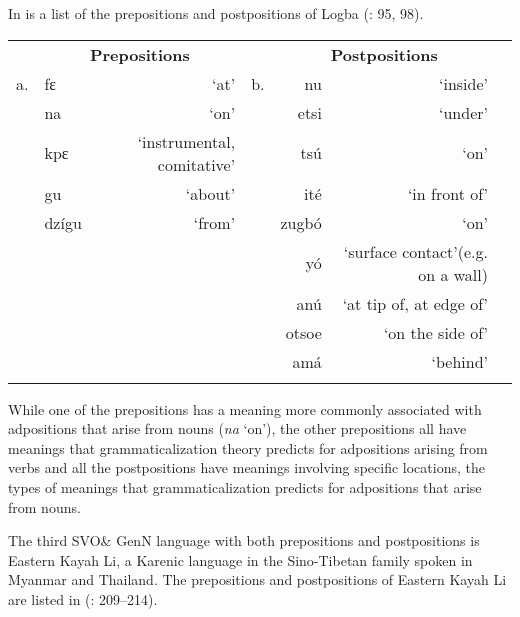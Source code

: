 \documentclass[output=paper]{langsci/langscibook}
\begin{document}
In  is a list of the prepositions and postpositions of Logba (\citealt{Dorvlo2008}: 95, 98).


\begin{table}
\begin{tabularx}{\textwidth}{Xlrrrrr}
\lsptoprule
 & \multicolumn{2}{c}{\bfseries Prepositions} &  & \multicolumn{2}{c}{\bfseries Postpositions}\\
a. & fɛ & ‘at’ & b. & nu & ‘inside’\\
 & na & ‘on’ &  & etsi & ‘under’\\
 & kpɛ & ‘instrumental, comitative’ &  & tsú & ‘on’\\
 & gu & ‘about’ &  & ité & ‘in front of’\\
 & dzígu & ‘from’ &  & zugbó & ‘on’\\
 &  &  &  & yó & {‘surface contact’}\newline (e.g. on a wall)\\
 &  &  &  & anú & ‘at tip of, at edge of’\\
 &  &  &  & otsoe & ‘on the side of’\\
 &  &  &  & amá & ‘behind’\\
\lspbottomrule
\end{tabularx}
\end{table}


While one of the prepositions has a meaning more commonly associated with adpositions that arise from nouns (\textit{na} ‘on’), the other prepositions all have meanings that grammaticalization theory predicts for adpositions arising from verbs and all the postpositions have meanings involving specific locations, the types of meanings that grammaticalization predicts for adpositions that arise from nouns.

The third SVO\& GenN language with both prepositions and postpositions is Eastern Kayah Li, a Karenic language in the Sino-Tibetan family spoken in Myanmar and Thailand. The prepositions and postpositions of Eastern Kayah Li are listed in  (\citealt{Solnit1997}: 209–214).
\end{document}
